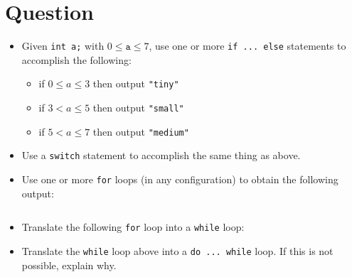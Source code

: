 




\docCopyright

\section{Question}

\begin{itemize}

  \item Given \texttt{int a;} with $0 \leq \texttt{a} \leq
    7$, use one or more \texttt{if ... else} statements to accomplish
    the following:
    \begin{itemize}
      \item if $0 \leq a \leq 3$ then output \texttt{"tiny"}
      \item if $3 < a \leq 5$ then output \texttt{"small"}
      \item if $5 < a \leq 7$ then output \texttt{"medium"}
    \end{itemize}
    \vfill

  \item Use a \texttt{switch} statement to accomplish the same thing
    as above.
    \vfill

    \newpage

  \item Use one or more \texttt{for} loops (in any configuration) to
    obtain the following output:
    \inputminted[label=Output]{text}{\docCodeDir/.for-nested.gen.output}

    \vfill

  \item Translate the following \texttt{for} loop into a
    \texttt{while} loop:
    \vfill

  \item Translate the \texttt{while} loop above into a
    \texttt{do ... while} loop.  If this is not possible, explain why.
    \vfill

\end{itemize}



